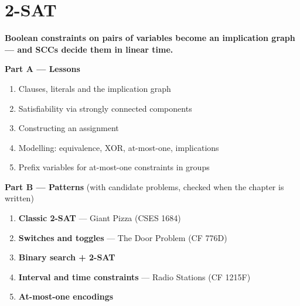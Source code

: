 \chapter{2-SAT}
\label{ch:two_sat}

\begin{tcolorbox}[enhanced, colback=white, colframe=secondaryblue, boxrule=1pt, arc=2mm]
\textbf{\large\textcolor{primaryblue}{Boolean constraints on pairs of variables become an implication graph --- and SCCs decide them in linear time.}}
\end{tcolorbox}


\begin{plannedbox}
\textbf{Part A --- Lessons}
\begin{enumerate}[leftmargin=*, label=\textbf{A\arabic*.}, itemsep=1pt]
    \item Clauses, literals and the implication graph
    \item Satisfiability via strongly connected components
    \item Constructing an assignment
    \item Modelling: equivalence, XOR, at-most-one, implications
    \item Prefix variables for at-most-one constraints in groups
\end{enumerate}
\textbf{Part B --- Patterns} (with candidate problems, checked when the chapter is written)
\begin{enumerate}[leftmargin=*, label=\textbf{P\arabic*.}, itemsep=1pt]
    \item \textbf{Classic 2-SAT} --- Giant Pizza {\small\color{darkgray}(CSES 1684)}
    \item \textbf{Switches and toggles} --- The Door Problem {\small\color{darkgray}(CF 776D)}
    \item \textbf{Binary search + 2-SAT}
    \item \textbf{Interval and time constraints} --- Radio Stations {\small\color{darkgray}(CF 1215F)}
    \item \textbf{At-most-one encodings}
\end{enumerate}
\end{plannedbox}
